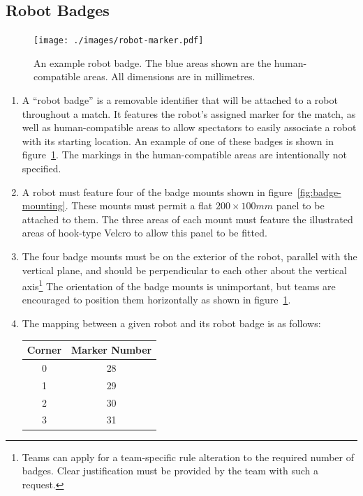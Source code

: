 \subsection{Robot Badges}
\label{sub:robot-badges}

\begin{figure}
  \centering
  \texttt{[image: ./images/robot-marker.pdf]}
  \caption{An example robot badge.
           The blue areas shown are the human-compatible areas.
           All dimensions are in millimetres.}
  \label{fig:example-badge}
\end{figure}

\begin{enumerate}
\item A ``robot badge'' is a removable identifier that will be attached to a robot throughout a match.
      It features the robot's assigned marker for the match, as well as human-compatible areas to allow spectators to easily associate a robot with its starting location.
      An example of one of these badges is shown in figure~\ref{fig:example-badge}.
      The markings in the human-compatible areas are intentionally not specified.

\item A robot must feature four of the badge mounts shown in figure~\ref{fig:badge-mounting}.
      These mounts must permit a flat $200 \times 100mm$ panel to be attached to them.
      The three areas of each mount must feature the illustrated areas of hook-type Velcro to allow this panel to be fitted.

\item The four badge mounts must be on the exterior of the robot, parallel with the vertical plane, and should be perpendicular to each other about the vertical axis\footnote{Teams can apply for a team-specific rule alteration to the required number of badges.
      Clear justification must be provided by the team with such a request.}
      The orientation of the badge mounts is unimportant, but teams are encouraged to position them horizontally as shown in figure~\ref{fig:example-badge}.

\item The mapping between a given robot and its robot badge is as follows:

\begin{center}
  \begin{tabular}{cc}
    \toprule
    \textbf{Corner} & \textbf{Marker Number} \\
    \midrule
    0 & 28 \\
    1 & 29 \\
    2 & 30 \\
    3 & 31 \\
    \bottomrule
  \end{tabular}
\end{center}


\end{enumerate}
